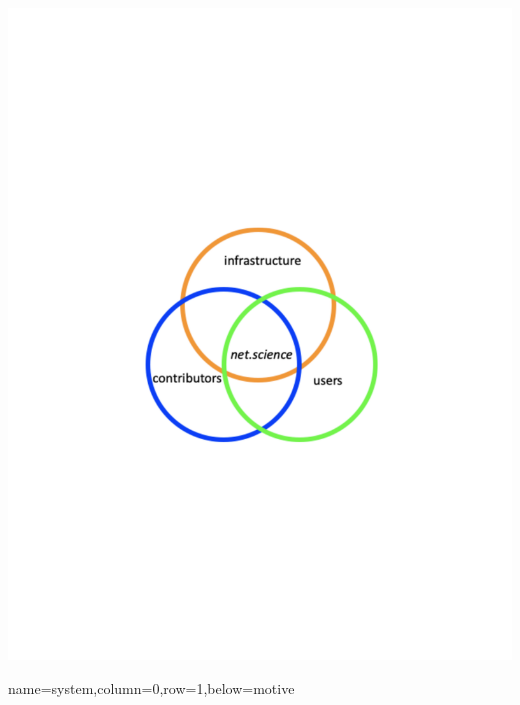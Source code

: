 \documentclass[landscape,paperwidth=70in,paperheight=46in,fontscale=0.225]{baposter} %
\begin{document}
\begin{poster}
{\begin{center}
   \includegraphics[scale=0.2]{figures/motivation.pdf}
   \end{center}

}
          {name=system,column=0,row=1,below=motive}{

}
\end{poster}
\end{document}
